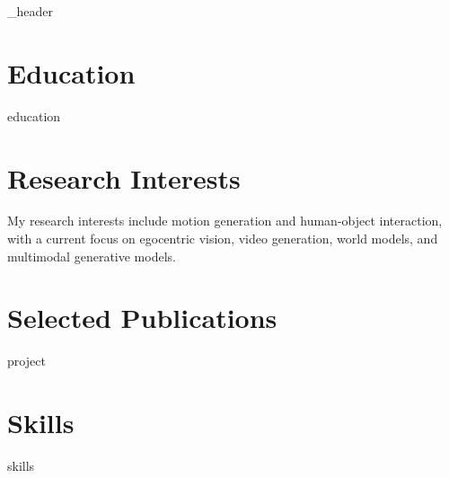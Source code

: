 \documentclass[a4paper,10pt]{article}
\author{Dawei Guan}
\begin{document}
{_header}
\vspace*{4pt}

\section{Education}
{education}
\vspace*{6pt}

\section{Research Interests}
\noindent My research interests include motion generation and human-object interaction, with a current focus on egocentric vision, video generation, world models, and multimodal generative models.
\vspace*{6pt}

\section{Selected Publications}
{project}
\vspace*{5pt}

\section{Skills}
{skills}
\end{document}
